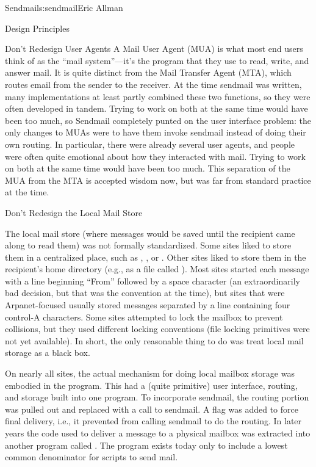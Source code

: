 \begin{aosachapter}{Sendmail}{s:sendmail}{Eric Allman}
\begin{aosasect1}{Design Principles}
\begin{aosasect2}{Don't Redesign User Agents}
A Mail User Agent (MUA) is what most end users think of as the ``mail
system''---it's the program that they use to read, write, and answer
mail. It is quite distinct from the Mail Transfer Agent (MTA), which
routes email from the sender to the receiver. At the time sendmail was
written, many implementations at least partly combined these two
functions, so they were often developed in tandem. Trying to work on
both at the same time would have been too much, so Sendmail completely
punted on the user interface problem: the only changes to MUAs were to
have them invoke sendmail instead of doing their own routing. In
particular, there were already several user agents, and people were
often quite emotional about how they interacted with mail.
Trying to work on both at the same time would have been too much.
This
separation of the MUA from the MTA is accepted wisdom now, but was far
from standard practice at the time.

\end{aosasect2}

\begin{aosasect2}{Don't Redesign the Local Mail Store}

The local mail store (where messages would be saved until the
recipient came along to read them) was not formally standardized. Some sites
liked to store them in a centralized place, such as ,
, or . Other sites liked to
store them in the recipient's home directory (e.g., as a file called
). Most sites started each message with a line beginning
``From'' followed by a space character (an extraordinarily bad
decision, but that was the convention at the time), but sites that
were Arpanet-focused usually stored messages separated by a line
containing four control-A characters. Some sites attempted to lock the
mailbox to prevent collisions, but they used different locking
conventions (file locking primitives were not yet available). In
short, the only reasonable thing to do was treat local mail storage as
a black box.

On nearly all sites, the actual mechanism for doing local mailbox
storage was embodied in the  program. This had a
(quite primitive) user interface, routing, and storage built into one
program. To incorporate sendmail, the routing portion was pulled out
and replaced with a call to sendmail.  A  flag was added to
force final delivery, i.e., it prevented  from calling
sendmail to do the routing. In later years the code used to deliver a
message to a physical mailbox was extracted into another program
called . The  program exists today
only to include a lowest common denominator for scripts to send
mail.


\end{aosasect2}
\end{aosasect1}
\end{aosachapter}
